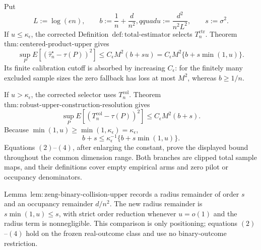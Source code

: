 Put
\[
 L:=\log(en),\qquad b:=\frac1n+\frac d{n^2},qquad
 u:=\frac{d^2}{n^2L^2},\qquad s:=\sigma^2.
\tag{1}
\]
If \(u\le\kappa_{\epsilon}\), the corrected Definition~\(\mathrm{def:total\text{-}estimator}\) selects \(T_n^{\mathrm{ctr}}\).  Theorem~\(\mathrm{thm:centered\text{-}product\text{-}upper}\) gives
\[
 \sup_P E[(\widehat\tau_n^{\star}-\tau(P))^2]
 \le C_{\epsilon}M^2(b+su)
 =C_{\epsilon}M^2\{b+s\min(1,u)\}.
\tag{2}
\]
Its finite calibration cutoff is absorbed by increasing \(C_{\epsilon}\): for the finitely many excluded sample sizes the zero fallback has loss at most \(M^2\), whereas \(b\ge1/n\).

If \(u>\kappa_{\epsilon}\), the corrected selector uses \(T_n^{\mathrm{col}}\).  Theorem~\(\mathrm{thm:robust\text{-}upper\text{-}construction\text{-}resolution}\) gives
\[
 \sup_P E[(T_n^{\mathrm{col}}-\tau(P))^2]
 \le C_{\epsilon}M^2(b+s).
\tag{3}
\]
Because \(\min(1,u)\ge\min(1,\kappa_{\epsilon})=\kappa_{\epsilon}\),
\[
 b+s\le\kappa_{\epsilon}^{-1}\{b+s\min(1,u)\}.
\tag{4}
\]
Equations \((2)\)--\((4)\), after enlarging the constant, prove the displayed bound throughout the common dimension range.  Both branches are clipped total sample maps, and their definitions cover empty empirical arms and zero pilot or occupancy denominators.

Lemma~\(\mathrm{lem:zeng\text{-}binary\text{-}collision\text{-}upper}\) records a radius remainder of order \(s\) and an occupancy remainder \(d/n^2\).  The new radius remainder is \(s\min(1,u)\le s\), with strict order reduction whenever \(u=o(1)\) and the radius term is nonnegligible.  This comparison is only positioning; equations \((2)\)--\((4)\) hold on the frozen real-outcome class and use no binary-outcome restriction.